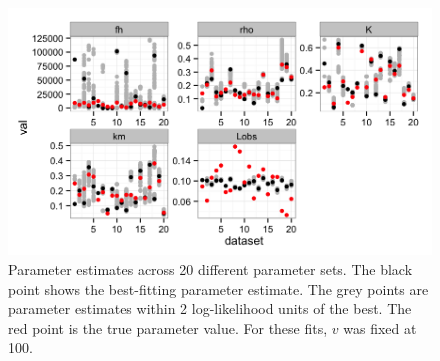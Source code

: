 \documentclass[12pt,reqno,final,pdftex]{amsart}\usepackage[]{graphicx}\usepackage[]{color}
\newenvironment{knitrout}{}{} %
\theoremstyle{plain}
\numberwithin{equation}{part}
\begin{document}
\begin{knitrout}\scriptsize
{}\color{fgcolor}\begin{figure}

\includegraphics[width=\linewidth]{figure/mult-datasets-fitting-1} \hfill{}

\caption[Parameter estimates across 20 different parameter sets]{Parameter estimates across 20 different parameter sets. The black point shows the best-fitting parameter estimate. The grey points are parameter estimates within 2 log-likelihood units of the best. The red point is the true parameter value. For these fits, $v$ was fixed at 100.}\label{fig:mult-datasets-fitting}
\end{figure}


\end{knitrout}
\end{document}
